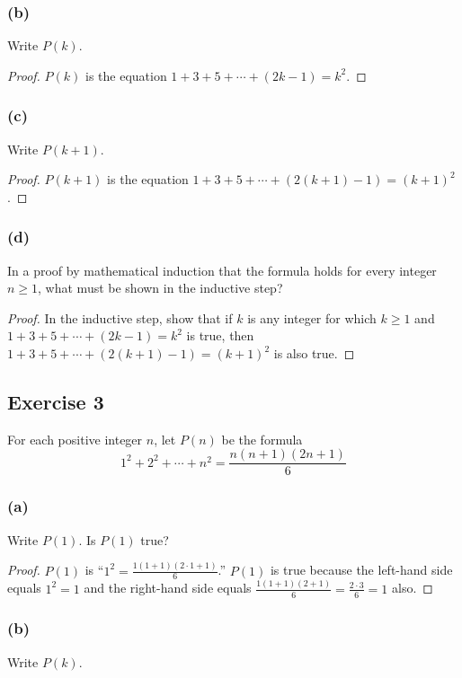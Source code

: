 \documentclass[14pt]{extarticle}
\begin{document}
\subsubsection{(b)}
Write $P(k)$.

\begin{proof}
    $P(k)$ is the equation $1 + 3 + 5 + \cdots + (2k - 1) = k^2$.
\end{proof}

\subsubsection{(c)}
Write $P(k + 1)$.

\begin{proof}
    $P(k + 1)$ is the equation $1 + 3 + 5 + \cdots + (2(k + 1) - 1) = (k + 1)^2$.
\end{proof}

\subsubsection{(d)}
In a proof by mathematical induction that the formula holds for every integer $n \geq 1$, what must be shown in the inductive step?

\begin{proof}
    In the inductive step, show that if $k$ is any integer for which $k \geq 1$ and $1 + 3 + 5 + \cdots + (2k - 1) = k^2$ is true, then $1 + 3 + 5 + \cdots + (2(k + 1) - 1) = (k + 1)^2$ is also true.
\end{proof}

\subsection{Exercise 3}
For each positive integer $n$, let $P(n)$ be the formula
\[
    1^2 + 2^2 + \cdots + n^2 = \frac{n(n+1)(2n+1)}{6}
\]
\subsubsection{(a)}
Write $P(1)$. Is $P(1)$ true?

\begin{proof}
    $P(1)$ is ``$1^2 = \frac{1(1+1)(2\cdot 1 + 1)}{6}$.'' $P(1)$ is true because the left-hand side equals $1^2 = 1$ and the right-hand side equals $\frac{1(1+1)(2 + 1)}{6} = \frac{2 \cdot 3}{6} = 1$ also.
\end{proof}

\subsubsection{(b)}
Write $P(k)$.
\end{document}
